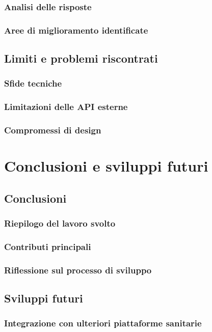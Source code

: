 \documentclass[12pt,a4paper,oneside]{report}
\begin{document}
\subsection{Analisi delle risposte}
\subsection{Aree di miglioramento identificate}

\section{Limiti e problemi riscontrati}
\subsection{Sfide tecniche}
\subsection{Limitazioni delle API esterne}
\subsection{Compromessi di design}





\chapter{Conclusioni e sviluppi futuri}
\section{Conclusioni}
\subsection{Riepilogo del lavoro svolto}
\subsection{Contributi principali}
\subsection{Riflessione sul processo di sviluppo}

\section{Sviluppi futuri}
\subsection{Integrazione con ulteriori piattaforme sanitarie}
\end{document}
